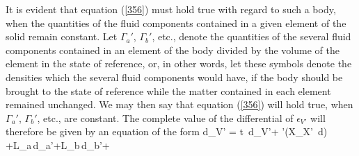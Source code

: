\documentclass[12pt]{article}
\begin{document}
{It is evident that equation (\ref{356}) must hold true with regard to such a body, when the quantities of the fluid components contained in a given element of the solid remain constant. Let $\Gamma_a'$, $\Gamma_b'$, etc., denote the quantities of the several fluid components contained in an element of the body divided by the volume of the element in the state of reference, or, in other words, let these symbols denote the densities which the several fluid components would have, if the body should be brought to the state of reference while the matter contained in each element remained unchanged. We may then say that equation (\ref{356}) will hold true, when $\Gamma_a'$, $\Gamma_b'$, etc., are constant. The complete value of the differential of $\epsilon_{V'}$ will therefore be given by an equation of the form
\eqs d\epsilon_{V'} = t \,d\eta_{V'}+  \sum\sum\nolimits'\left(X_{X'} \,d\right) +L_a\,d\Gamma_a'+L_b\,d\Gamma_b'+     \label{462}\eqe


}
\end{document}

